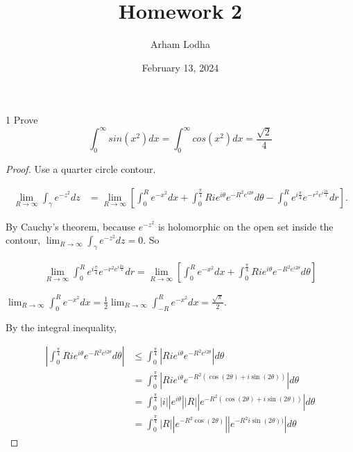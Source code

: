 \documentclass{article}
\newcommand{\abs}[1]{\left\lvert #1\right\rvert}
\begin{document}
\title{Homework 2}
\author{Arham Lodha}%
\date{February 13, 2024}%
\maketitle

\begin{PROB}{1}\label{Problem 1.}
    Prove \[\int_{0}^{\infty}sin(x^2)dx = \int_{0}^{\infty}cos(x^2)dx= \frac{\sqrt{2}}{4}\]
\end{PROB}
\begin{proof}
    Use a quarter circle contour.

    \begin{align*}
        \lim_{R \to \infty} \int_{\gamma} e^{-z^2} dz &= \lim_{R \to \infty} \left[\int_{0}^{R} e^{-x^2} dx + \int_{0}^{\frac{\pi}{4}} Rie^{i \theta} e^{-R^2e^{i 2\theta}} d \theta - \int_{0}^{R} e^{i \frac{\pi}{4}} e^{-r^2e^{i \frac{2\pi}{4}}} dr\right].
    \end{align*}

    By Cauchy's theorem, because $e^{-z^2}$ is holomorphic on the open set inside the contour, $\lim_{R \to \infty} \int_{\gamma} e^{-z^2} dz = 0$. So
    
    \begin{align*}
        \lim_{R \to \infty} \int_{0}^{R} e^{i \frac{\pi}{4}} e^{-r^2e^{i \frac{2\pi}{4}}} dr = \lim_{R \to \infty} \left[\int_{0}^{R} e^{-x^2} dx + \int_{0}^{\frac{\pi}{4}} Rie^{i \theta} e^{-R^2e^{i 2\theta}} d \theta\right]
    \end{align*}

    $\lim_{R \to \infty} \int_{0}^{R} e^{-x^2} dx  = \frac{1}{2} \lim_{R \to \infty} \int_{-R}^{R} e^{-x^2} dx = \frac{\sqrt{\pi}}{2}$.

    By the integral inequality, 
    
    \begin{align*}
        \abs{\int_{0}^{\frac{\pi}{4}} Rie^{i \theta} e^{-R^2e^{i 2\theta}} d \theta} &\leq \int_{0}^{\frac{\pi}{4}} \abs{Rie^{i \theta} e^{-R^2e^{i 2\theta}}} d \theta \\ 
        &= \int_{0}^{\frac{\pi}{4}} \abs{Rie^{i \theta} e^{-R^2( \cos(2\theta) + i \sin(2 \theta))} }d \theta \\
        &= \int_{0}^{\frac{\pi}{4}} \abs{i} \abs{e^{i \theta}} \abs{R} \abs{e^{-R^2( \cos(2\theta) + i \sin(2 \theta))} }d \theta \\
        &= \int_{0}^{\frac{\pi}{4}}  \abs{R} \abs{e^{-R^2\cos(2\theta)}} \abs{e^{-R^2 i \sin(2 \theta))} }d \theta
    \end{align*}


\end{proof}
\end{document}
